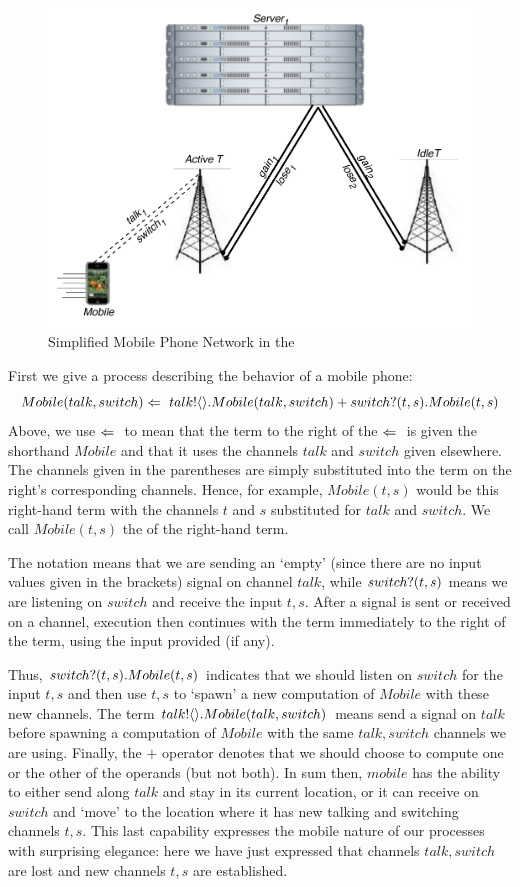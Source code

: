 	\begin{figure}[H]
	\centering
	\includegraphics[scale=0.7]{figures/cell_network_pi.pdf} %
	\caption{Simplified Mobile Phone Network in the \picalc}
	\label{fig_cell_network_pi}
	\end{figure}
	
	First we give a process describing the behavior of a mobile phone:
	\[
		Mobile(talk, switch) \Leftarrow\  {talk}!\langle{}\rangle. Mobile(talk,switch) + {switch}?({t,s}). Mobile(t,s)
	\]
	Above, we use $\Leftarrow\ $ to mean that the term to the right of the $\Leftarrow\ $ is given the shorthand $Mobile$ and that it uses the channels $talk$ and $switch$ given elsewhere.  
The channels given in the parentheses are simply substituted into the term on the right's corresponding channels.  
Hence, for example, $Mobile(t,s)$ would be this right-hand term with the channels $t$ and $s$ substituted for $talk$ and $switch$. 
We call $Mobile(t,s)$ the  of the right-hand term.
	
	The notation  means that we are sending an `empty' (since there are no input values given in the brackets) signal on channel $talk$, while ${switch}?({t,s})$ means we are listening on $switch$ and receive the input $t,s$.  
After a signal is sent or received on a channel, execution then continues with the term immediately to the right of the term, using the input provided (if any).  

	
	Thus, ${switch}?({t,s}). Mobile(t,s)$ indicates that we should listen on $switch$ for the input $t,s$ and then use $t,s$ to `spawn' a new computation of $Mobile$ with these new channels. 
	The term ${talk}!\langle{}\rangle. Mobile(talk,switch)$ means send a signal on $talk$ before spawning a computation of $Mobile$ with the same $talk,switch$ channels we are using.  
Finally, the $+$ operator denotes that we should choose to compute one or the other of the operands (but not both).  
In sum then, $mobile$ has the ability to either send along $talk$ and stay in its current location, or it can receive on $switch$ and `move' to the location where it has new talking and switching channels $t,s$.  
This last capability expresses the mobile nature of our processes with surprising elegance: here we have just expressed that channels $talk,switch$ are lost and new channels $t,s$ are established.
	
